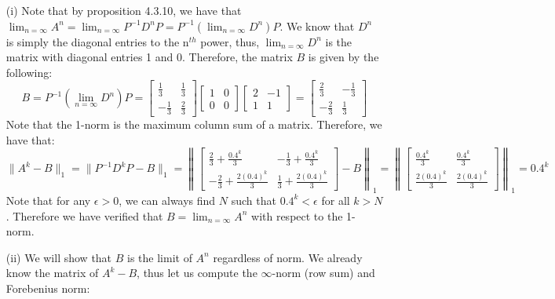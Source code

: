 \documentclass[letterpaper,12pt]{article}
\theoremstyle{definition}
\begin{document}
\begin{enumerate}
\begin{enumerate}
      \item[(i)]
      Note that by proposition 4.3.10, we have that $\lim_{n=\infty}A^n = \lim_{n=\infty}P^{-1}D^nP = P^{-1}(\lim_{n=\infty}D^n)P$. We know that $D^n$ is simply the diagonal entries to the n$^{th}$ power, thus, $\lim_{n=\infty}D^n$ is the matrix with diagonal entries 1 and 0. Therefore, the matrix $B$ is given by the following:
      \[
        B = P^{-1}(\lim_{n=\infty}D^n)P =
        \begin{bmatrix}
          \frac{1}{3} & \frac{1}{3} \\
          -\frac{1}{3} & \frac{2}{3}
        \end{bmatrix}
        \begin{bmatrix}
          1 & 0 \\
          0 & 0
        \end{bmatrix}
        \begin{bmatrix}
          2 & -1 \\
          1 & 1
        \end{bmatrix}
        =
        \begin{bmatrix}
          \frac{2}{3} & -\frac{1}{3} \\
          -\frac{2}{3} & \frac{1}{3}
        \end{bmatrix}
      \]
      Note that the 1-norm is the maximum column sum of a matrix. Therefore, we have that:
      \[
        \|A^k-B\|_1 = \|P^{-1}D^kP-B\|_1 =
        \left\|
        \begin{bmatrix}
          \frac{2}{3}+\frac{0.4^k}{3} & -\frac{1}{3}+\frac{0.4^k}{3} \\
          -\frac{2}{3}+\frac{2(0.4)^k}{3} & \frac{1}{3}+\frac{2(0.4)^k}{3}
        \end{bmatrix}
        -
        B
        \right\|_1
        =
        \left\|
        \begin{bmatrix}
          \frac{0.4^k}{3} & \frac{0.4^k}{3} \\
          \frac{2(0.4)^k}{3} & \frac{2(0.4)^k}{3}
        \end{bmatrix}
        \right\|_1
        = 0.4^k
      \]
      Note that for any $\epsilon > 0$, we can always find $N$ such that $0.4^k < \epsilon$ for all $k > N$. Therefore we have verified that $B = \lim_{n=\infty}A^n$ with respect to the 1-norm.
      \item[(ii)]
      We will show that $B$ is the limit of $A^n$ regardless of norm. We already know the matrix of $A^k-B$, thus let us compute the $\infty$-norm (row sum) and Forebenius norm:

\end{enumerate}
\end{enumerate}
\end{document}
